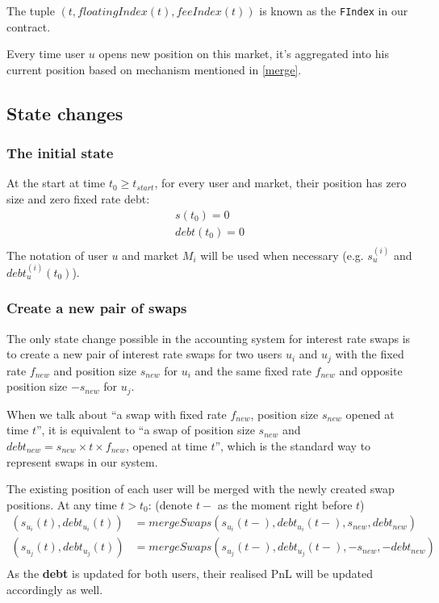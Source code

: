 \documentclass{article}%
\begin{document}
The tuple $(t, floatingIndex(t), feeIndex(t))$ is known as the \texttt{FIndex} in our contract.

Every time user $u$ opens new position on this market, it's aggregated into his current position based on mechanism mentioned in \ref{merge}.

\subsection{State changes}
\subsubsection{The initial state}
At the start at time $t_0 \geq t_{start}$, for every user and market, their position has zero size and zero fixed rate debt:
    \begin{align*}
        s(t_0) = 0 \\
        debt(t_0) = 0 \\
    \end{align*}
The notation of user $u$ and market $M_i$ will be used when necessary (e.g. $s_u^{(i)}$ and $debt_u^{(i)}(t_0)$).
\subsubsection{Create a new pair of swaps}
The only state change possible in the accounting system for interest rate swaps is to create a new pair of interest rate swaps for two users $u_i$ and $u_j$ with the fixed rate $f_{new}$ and position size $s_{new}$ for $u_i$ and the same fixed rate $f_{new}$ and opposite position size $-s_{new}$ for $u_j$. 

When we talk about ``a swap with fixed rate $f_{new}$, position size $s_{new}$ opened at time $t$'', it is equivalent to ``a swap of position size $s_{new}$ and $debt_{new} = s_{new} \times t \times f_{new}$, opened at time $t$'', which is the standard way to represent swaps in our system. 

The existing position of each user will be merged with the newly created swap positions.
At any time $t > t_0$: (denote $t-$ as the moment right before $t$)
    \begin{align*}
        (s_{u_i}(t), debt_{u_i}(t)) &= mergeSwaps(s_{u_i}(t-), debt_{u_i}(t-), s_{new}, debt_{new})\\
        (s_{u_j}(t), debt_{u_j}(t)) &= mergeSwaps(s_{u_j}(t-), debt_{u_j}(t-), -s_{new}, -debt_{new})\\
    \end{align*}
As the \textbf{debt} is updated for both users, their realised PnL will be updated accordingly as well.
\end{document}

